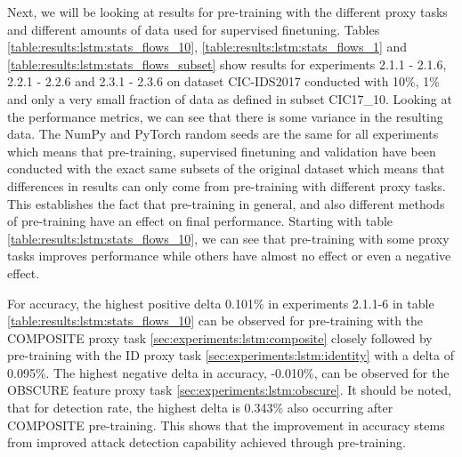 

Next, we will be looking at results for pre-training with the different proxy tasks and different amounts of data used for supervised finetuning. Tables \ref{table:results:lstm:stats_flows_10}, \ref{table:results:lstm:stats_flows_1} and \ref{table:results:lstm:stats_flows_subset} show results for experiments 2.1.1 - 2.1.6, 2.2.1 - 2.2.6 and 2.3.1 - 2.3.6 on dataset CIC-IDS2017 conducted with 10\%, 1\% and only a very small fraction of data as defined in subset CIC17\_10. Looking at the performance metrics, we can see that there is some variance in the resulting data. The NumPy and PyTorch random seeds are the same for all experiments which means that pre-training, supervised finetuning and validation have been conducted with the exact same subsets of the original dataset which means that differences in results can only come from pre-training with different proxy tasks. This establishes the fact that pre-training in general, and also different methods of pre-training have an effect on final performance. Starting with table \ref{table:results:lstm:stats_flows_10}, we can see that pre-training with some proxy tasks improves performance while others have almost no effect or even a negative effect. \par





For accuracy, the highest positive delta 0.101\% in experiments 2.1.1-6 in table \ref{table:results:lstm:stats_flows_10} can be observed for pre-training with the COMPOSITE proxy task \ref{sec:experiments:lstm:composite} closely followed by pre-training with the ID proxy task \ref{sec:experiments:lstm:identity} with a delta of 0.095\%. The highest negative delta in accuracy, -0.010\%, can be observed for the OBSCURE feature proxy task \ref{sec:experiments:lstm:obscure}. It should be noted, that for detection rate, the highest delta is 0.343\% also occurring after COMPOSITE pre-training. This shows that the improvement in accuracy stems from improved attack detection capability achieved through pre-training. \par





